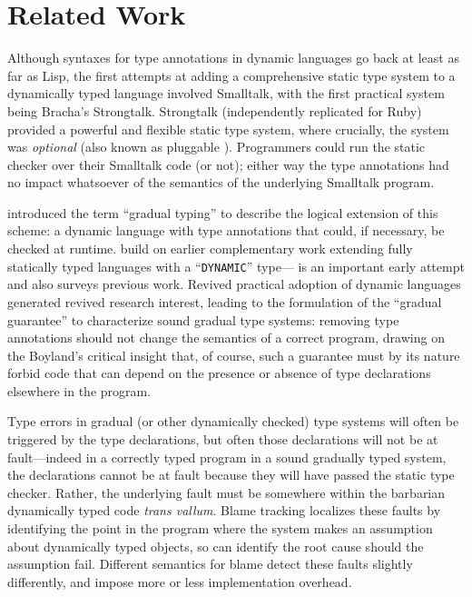 
\section{Related Work}
\label{sec:related-work}

Although syntaxes for type annotations in dynamic languages go back at
least as far as Lisp\citep{cltl2}, the first attempts at adding a
comprehensive static type system to a dynamically typed
language involved 
Smalltalk\citep{RalphJohnson1986}, with the first practical system
being Bracha's Strongtalk\citep{strongtalk}. Strongtalk
(independently replicated for Ruby\citep{DBRuby09}) provided a
powerful and flexible static type system, where crucially, the system
was \emph{optional} (also known as pluggable
\cite{GiladPluggable2004}). Programmers could run the static checker
over their Smalltalk code (or not); either way the type annotations
had no impact whatsoever of the semantics of the underlying Smalltalk
program.

\citet{Siek2006} introduced the term ``gradual typing''
 to describe the logical extension of this scheme: a
dynamic language with type annotations that could, if necessary, be
checked at runtime. \citeauthor{Siek2006} build on earlier complementary work extending fully statically typed languages with a ``\texttt{DYNAMIC}''
type---\citet{AbadiTOPLAS1991} is an
important early attempt
and also surveys previous work. Revived practical adoption of dynamic
languages generated revived research interest, leading to the
formulation of the ``gradual guarantee''\citep{Siek2006,Siek2015} to characterize sound
gradual type systems: removing type annotations should not change the
semantics of a correct program, drawing on the Boyland's critical
insight that, of course, such a guarantee must by its nature forbid
code that can depend on the presence or absence of type declarations 
elsewhere in the program\citep{Boyland2014}. 

Type errors in gradual (or other dynamically checked) type systems will
often be triggered by the type declarations, but often those
declarations will not be at fault---indeed in a correctly typed
program in a sound gradually typed system,  the declarations cannot be
at fault because they will have passed the static type
checker. Rather, the underlying fault must be somewhere within the
barbarian dynamically typed code \emph{trans vallum}.
Blame tracking\citep{blame2009,blameThreesomes2010,blameForAll2011} localizes these
faults by identifying 
the point in the program where the system makes an 
assumption about dynamically typed objects, so can identify the root
cause should the assumption fail.  Different semantics for blame
detect these faults slightly differently, and impose more or less
implementation overhead\citep{reticPython2014,monotonic2015,Vitousek2017}.

